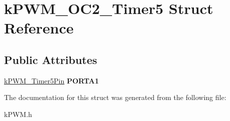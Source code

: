 \hypertarget{structkPWM__OC2__Timer5}{}\section{k\+P\+W\+M\+\_\+\+O\+C2\+\_\+\+Timer5 Struct Reference}
\label{structkPWM__OC2__Timer5}
\subsection*{Public Attributes}
\begin{DoxyCompactItemize}
\item 
\hyperlink{structkPWM__Timer5Pin}{k\+P\+W\+M\+\_\+\+Timer5\+Pin} {\bfseries P\+O\+R\+T\+A1}\hypertarget{structkPWM__OC2__Timer5_a6971dd914847b55c5715957d97bb5e58}{}\label{structkPWM__OC2__Timer5_a6971dd914847b55c5715957d97bb5e58}

\end{DoxyCompactItemize}


The documentation for this struct was generated from the following file\+:\begin{DoxyCompactItemize}
\item 
k\+P\+W\+M.\+h\end{DoxyCompactItemize}
